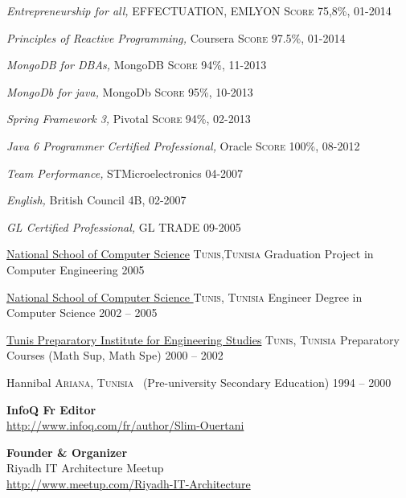 \documentclass[10pt,a4paper]{article}
\begin{document}
\headedsection
  {{\sl \textit {Entrepreneurship for all},} EFFECTUATION, EMLYON}
  {\textsc{Score 75,8\%, 01-2014}} 

\headedsection
  {{\sl \textit {Principles of Reactive Programming},} Coursera}
  {\textsc{Score 97.5\%, 01-2014}} 

\headedsection
  {{\sl \textit {MongoDB for DBAs},} MongoDB}
  {\textsc{Score 94\%, 11-2013}} 
  
\headedsection
  {{\sl \textit {MongoDb for java},} MongoDb}
  {\textsc{Score 95\%, 10-2013}} 
  
\headedsection
  {{\sl \textit {Spring Framework 3},} Pivotal}
  {\textsc{Score 94\%, 02-2013}} 
  
\headedsection
  {{\sl \textit {Java 6 Programmer Certified Professional},} Oracle}
  {\textsc{Score 100\%, 08-2012}} 
  
\headedsection
  {{\sl \textit {Team Performance},} STMicroelectronics}
  {\textsc{04-2007}} 

\headedsection
  {{\sl \textit {English},} British Council}
  {\textsc{4B, 02-2007}} 
  
\headedsection
  {{\sl \textit {GL Certified Professional},} GL TRADE}
  {\textsc{09-2005}} 

\spacedhrule{0em}{-0.4em}



\headedsection
  {\href{http://www.ensi.rnu.tn/}{ National School of Computer Science}}
  {\textsc{Tunis,Tunisia}} {%
  \headedsubsection
    {Graduation Project in Computer Engineering}
    {2005}{}
}

\headedsection
 {\href{http://www.ensi.rnu.tn/}{ National School of Computer Science }}
  {\textsc{Tunis, Tunisia}} {%
  \headedsubsection
    {Engineer Degree in Computer Science}
    {2002 -- 2005} {}
}



\headedsection
  {\href{http://www.ipeit.rnu.tn/en}{Tunis Preparatory Institute for Engineering Studies}}
  {\textsc{Tunis, Tunisia}} {%
  \headedsubsection
    {Preparatory Courses (Math Sup, Math Spe)}
    {2000 -- 2002} {}
}

\headedsection
  {{Hannibal}}
  {\textsc{Ariana, Tunisia}} {%
  \headedsubsection
    { \textnormal{~(Pre-university Secondary Education)}}
    {1994 -- 2000} {}
}

\spacedhrule{0em}{-0.4em}

\begin{multicols}{2}

{\bf  InfoQ Fr Editor} \\
\url{http://www.infoq.com/fr/author/Slim-Ouertani} 

\columnbreak


{\bf Founder \& Organizer} \\
Riyadh IT Architecture Meetup\\
\url{http://www.meetup.com/Riyadh-IT-Architecture}\\
 


\end{multicols}
\end{document}
